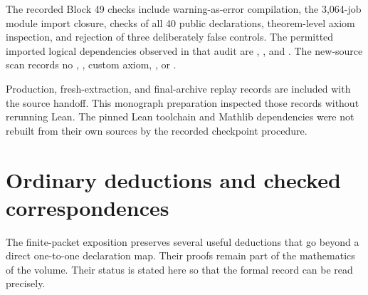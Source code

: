 The recorded Block 49 checks include warning-as-error compilation, the 3,064-job module import closure, checks of all 40 public declarations, theorem-level axiom inspection, and rejection of three deliberately false controls. The permitted imported logical dependencies observed in that audit are , , and . The new-source scan records no , , custom axiom, , or .

Production, fresh-extraction, and final-archive replay records are included with the source handoff. This monograph preparation inspected those records without rerunning Lean. The pinned Lean toolchain and Mathlib dependencies were not rebuilt from their own sources by the recorded checkpoint procedure.

\section{Ordinary deductions and checked correspondences}
The finite-packet exposition preserves several useful deductions that go beyond a direct one-to-one declaration map. Their proofs remain part of the mathematics of the volume. Their status is stated here so that the formal record can be read precisely.

